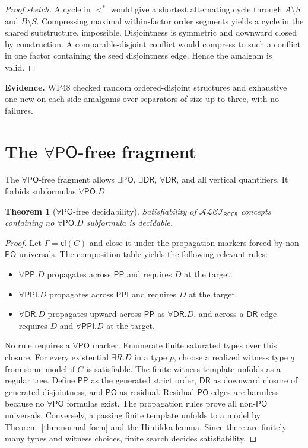 \documentclass[11pt]{article}
\newtheorem{theorem}{Theorem}[section]
\newcommand{\PP}{\mathsf{PP}}
\newcommand{\PPI}{\mathsf{PPI}}
\newcommand{\PO}{\mathsf{PO}}
\newcommand{\DR}{\mathsf{DR}}
\newcommand{\cl}{\mathsf{cl}}
\newcommand{\ALCI}{\mathcal{ALCI}_{\mathsf{RCC5}}}
\begin{document}
\begin{proof}[Proof sketch]
A cycle in $<^*$ would give a shortest alternating cycle through $A\setminus S$ and $B\setminus S$.  Compressing maximal within-factor order segments yields a cycle in the shared substructure, impossible.  Disjointness is symmetric and downward closed by construction.  A comparable-disjoint conflict would compress to such a conflict in one factor containing the seed disjointness edge.  Hence the amalgam is valid.
\end{proof}

\noindent\textbf{Evidence.} WP48 checked random ordered-disjoint structures and exhaustive one-new-on-each-side amalgams over separators of size up to three, with no failures.

\section{The $\forall\PO$-free fragment}

The $\forall\PO$-free fragment allows $\exists\PO$, $\exists\DR$, $\forall\DR$, and all vertical quantifiers.  It forbids subformulas $\forall\PO.D$.

\begin{theorem}[$\forall\PO$-free decidability]\label{thm:forallpo-free}
Satisfiability of $\ALCI$ concepts containing no $\forall\PO.D$ subformula is decidable.
\end{theorem}

\begin{proof}
Let $\Gamma=\cl(C)$ and close it under the propagation markers forced by non-$\PO$ universals.  The composition table yields the following relevant rules:
\begin{itemize}
\item $\forall\PP.D$ propagates across $\PP$ and requires $D$ at the target.
\item $\forall\PPI.D$ propagates across $\PPI$ and requires $D$ at the target.
\item $\forall\DR.D$ propagates upward across $\PP$ as $\forall\DR.D$, and across a $\DR$ edge requires $D$ and $\forall\PPI.D$ at the target.
\end{itemize}
No rule requires a $\forall\PO$ marker.  Enumerate finite saturated types over this closure.  For every existential $\exists R.D$ in a type $p$, choose a realized witness type $q$ from some model if $C$ is satisfiable.  The finite witness-template unfolds as a regular tree.  Define $\PP$ as the generated strict order, $\DR$ as downward closure of generated disjointness, and $\PO$ as residual.  Residual $\PO$ edges are harmless because no $\forall\PO$ formulas exist.  The propagation rules prove all non-$\PO$ universals.  Conversely, a passing finite template unfolds to a model by Theorem~\ref{thm:normal-form} and the Hintikka lemma.  Since there are finitely many types and witness choices, finite search decides satisfiability.
\end{proof}
\end{document}
